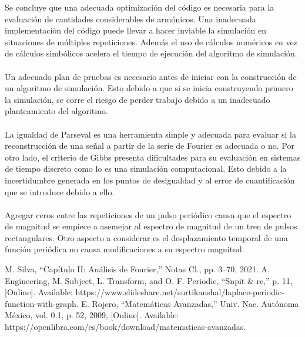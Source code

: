 \documentclass[7pt]{article}
\begin{document}
    Se concluye que una adecuada optimización del código es necesaria para la evaluación de cantidades 
    considerables de armónicos. Una inadecuada implementación del código puede llevar a hacer inviable 
    la simulación en situaciones de múltiples repeticiones. Además el uso de cálculos numéricos en vez 
    de cálculos simbólicos acelera el tiempo de ejecución del algoritmo de simulación.\\
    \\
    Un adecuado plan de pruebas es necesario antes de iniciar con la construcción de un algoritmo 
    de simulación. Esto debido a que si se inicia construyendo primero la simulación, se corre el 
    riesgo de perder trabajo debido a un inadecuado planteamiento del algoritmo.\\
    \\
    La igualdad de Parseval es una herramienta simple y adecuada para evaluar si la reconstrucción de 
    una señal a partir de la serie de Fourier es adecuada o no. Por otro lado, el criterio de Gibbs 
    presenta dificultades para su evaluación en sistemas de tiempo discreto como lo es una simulación 
    computacional. Esto debido a la incertidumbre generada en los puntos de desigualdad y al error de 
    cuantificación que se introduce debido a ello.\\
    \\
    Agregar ceros entre las repeticiones de un pulso periódico causa que el espectro de magnitud 
    se empiece a asemejar al espectro de magnitud de un tren de pulsos rectangulares. Otro aspecto a 
    considerar es el desplazamiento temporal de una función periódica no causa modificaciones a su espectro 
    magnitud. 

\begin{thebibliography}{99}
        M. Silva, “Capítulo II: Análisis de Fourier,” Notas Cl., pp. 3–70, 2021.
        A. Engineering, M. Subject, L. Transform, and O. F. Periodic, “Snpit \& rc,” p. 11, [Online]. Available: https://www.slideshare.net/surtikaushal/laplace-periodic-function-with-graph.
        E. Rojero, “Matemáticas Avanzadas,” Univ. Nac. Autónoma México, vol. 0.1, p. 52, 2009, [Online]. Available: https://openlibra.com/es/book/download/matematicas-avanzadas.
\end{thebibliography}
\end{document}
